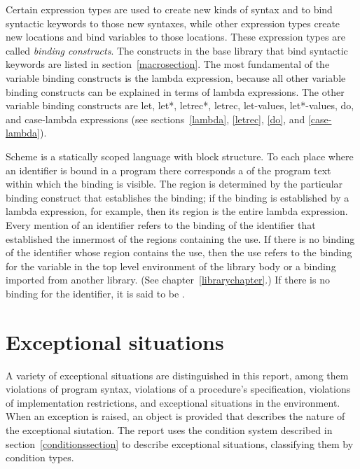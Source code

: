 

\vest Certain expression types are used to create new kinds of syntax
and to bind syntactic keywords to those new syntaxes, while other
expression types create new locations and bind variables to those
locations.  These expression types are called {\em binding constructs}.
The constructs in the base library that bind syntactic keywords are listed in section~\ref{macrosection}.
The most fundamental of the variable binding constructs is the
{\cf lambda} expression, because all other variable binding constructs
can be explained in terms of {\cf lambda} expressions.  The other
variable binding constructs are {\cf let}, {\cf let*}, {\cf letrec*},
{\cf letrec}, {\cf let-values}, {\cf let*-values}, {\cf do}, and {\cf
  case-lambda} expressions (see sections~\ref{lambda}, \ref{letrec}, 
\ref{do}, and \ref{case-lambda}).


\vest Scheme is a statically scoped language with
block structure.  To each place where an identifier is bound in a program
there corresponds a  of the program text within which
the binding is visible.  The region is determined by the particular
binding construct that establishes the binding; if the binding is
established by a {\cf lambda} expression, for example, then its region
is the entire {\cf lambda} expression.  Every mention of an identifier
refers to the binding of the identifier that established the
innermost of the regions containing the use.  If there is no binding of
the identifier whose region contains the use, then the use refers to the
binding for the variable in the top level environment of the library
body or a binding imported from another library.  (See
chapter~\ref{librarychapter}.)
If there is no binding for the identifier,
it is said to be .

\section{Exceptional situations}
\label{exceptionalsituationsection}

A variety of exceptional situations
are distinguished in this report, among them violations of program
syntax, violations of a procedure's specification, violations of
implementation restrictions, and exceptional situations in the
environment.  When an exception is raised, an object is provided that
describes the nature of the exceptional siutation.  The report uses
the condition system described in section~\ref{conditionssection} to
describe exceptional situations, classifying them by condition types.

